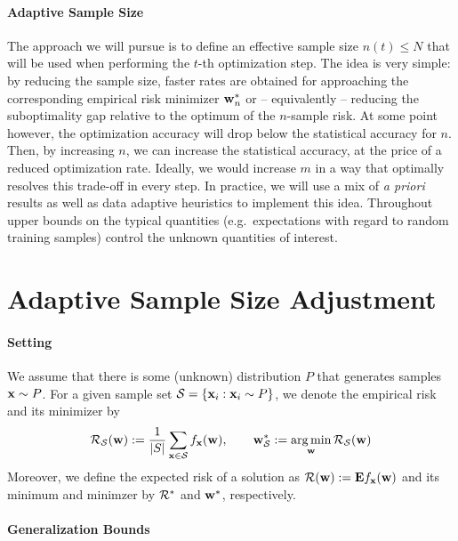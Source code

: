 \documentclass{article}
\renewcommand{\S}{{\cal S}}
\newcommand{\w}{{\bf w}}
\newcommand{\x}{{\bf x}}
\newcommand{\risk}{{\cal R}}
\newcommand{\E}{{\bf E}}
\DeclareMathOperator*{\argmin}{\arg\min}
\begin{document}
\paragraph{Adaptive Sample Size} The approach we will pursue is to define an effective sample size $n(t) \le N$ that will be used when performing the $t$-th optimization step. The idea is very simple: by reducing the sample size, faster rates are obtained for approaching the corresponding empirical risk minimizer $\w_n^*$ or -- equivalently -- reducing the suboptimality gap relative to the optimum of the $n$-sample risk. At some point however, the optimization accuracy will drop below the statistical accuracy for $n$. Then, by increasing $n$, we can increase the statistical accuracy, at the price of a reduced optimization rate. Ideally, we would increase $m$ in a way that optimally resolves this trade-off in every step. In practice, we will use a mix of \textit{a priori} results as well as data adaptive heuristics  to implement this idea. Throughout upper bounds on the typical quantities (e.g.~expectations with regard to random training samples) control the unknown quantities of interest. 

\section{Adaptive Sample Size Adjustment}

\paragraph{Setting}

We assume that there is some (unknown) distribution $P$ that generates samples $\x \sim P$. For a given sample set $\S = \{\x_i: \x_i \sim P \}$, we denote the empirical risk and its minimizer by 
\begin{align}
\risk_\S(\w) := \frac {1}{|S|} \sum_{\x \in \S} f_\x(\w),
\qquad \w^*_\S := \argmin_\w \risk_\S(\w) 
\end{align} 
Moreover, we define the expected risk of a solution as $\risk(\w) := \E f_\x(\w)$ and its minimum and minimzer by $\risk^*$ and $\w^*$, respectively. 

\paragraph{Generalization Bounds}
\end{document}
